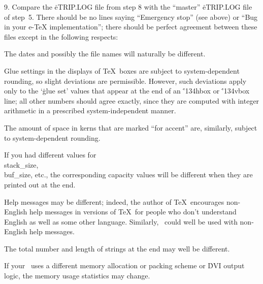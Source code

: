 \item{9.} Compare the \.{eTRIP.LOG} file from step 8 with the ``master''
\.{eTRIP.LOG} file of step~5.  There should be no lines saying
``Emergency stop'' (see above) or ``Bug in your e-TeX implementation'';
there should be perfect agreement between these files except in the
following respects:

 The dates and possibly the file names will naturally be
different.

 Glue settings in the displays of \TeX\ boxes are subject
to system-dependent rounding, so slight deviations are permissible.
However, such deviations apply only to the `\.{glue set}' values that
appear at the end of an \.{\char'134hbox} or \.{\char'134vbox} line; all
other numbers should agree exactly, since they are computed with integer
arithmetic in a prescribed system-independent manner.

 The amount of space in kerns that are marked ``for
accent'' are, similarly, subject to system-dependent rounding.

 If you had different values for \\{stack\_size},
\\{buf\_size}, etc., the corresponding capacity values will be different
when they are printed out at the end.

 Help messages may be different; indeed, the author of
\TeX\ encourages non-English help messages in versions of \TeX\ for
people who don't understand English as well as some other language.
Similarly, \eTeX\ could well be used with non-English help messages.

 The total number and length of strings at the end may well
be different.

 If your \eTeX\ uses a different memory allocation or
packing scheme or \.{DVI} output logic, the memory usage statistics may
change.

